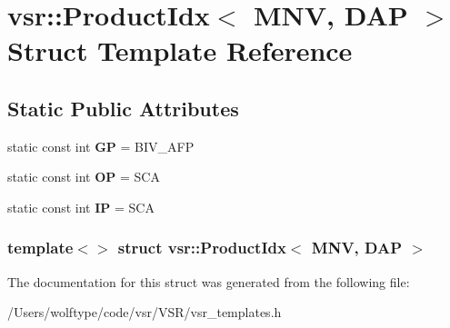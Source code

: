 \hypertarget{structvsr_1_1_product_idx_3_01_m_n_v_00_01_d_a_p_01_4}{\section{vsr\-:\-:Product\-Idx$<$ M\-N\-V, D\-A\-P $>$ Struct Template Reference}
\label{structvsr_1_1_product_idx_3_01_m_n_v_00_01_d_a_p_01_4}
}
\subsection*{Static Public Attributes}
\begin{DoxyCompactItemize}
\item 
\hypertarget{structvsr_1_1_product_idx_3_01_m_n_v_00_01_d_a_p_01_4_a32b48dc7aab68dff5eb055730a4804f1}{static const int {\bfseries G\-P} = B\-I\-V\-\_\-\-A\-F\-P}\label{structvsr_1_1_product_idx_3_01_m_n_v_00_01_d_a_p_01_4_a32b48dc7aab68dff5eb055730a4804f1}

\item 
\hypertarget{structvsr_1_1_product_idx_3_01_m_n_v_00_01_d_a_p_01_4_a89fe19e3fb2991b879b7a82e06b7e59e}{static const int {\bfseries O\-P} = S\-C\-A}\label{structvsr_1_1_product_idx_3_01_m_n_v_00_01_d_a_p_01_4_a89fe19e3fb2991b879b7a82e06b7e59e}

\item 
\hypertarget{structvsr_1_1_product_idx_3_01_m_n_v_00_01_d_a_p_01_4_a621068780fc8c244280a62e9699faa63}{static const int {\bfseries I\-P} = S\-C\-A}\label{structvsr_1_1_product_idx_3_01_m_n_v_00_01_d_a_p_01_4_a621068780fc8c244280a62e9699faa63}

\end{DoxyCompactItemize}
\subsubsection*{template$<$$>$ struct vsr\-::\-Product\-Idx$<$ M\-N\-V, D\-A\-P $>$}



The documentation for this struct was generated from the following file\-:\begin{DoxyCompactItemize}
\item 
/\-Users/wolftype/code/vsr/\-V\-S\-R/vsr\-\_\-templates.\-h\end{DoxyCompactItemize}
